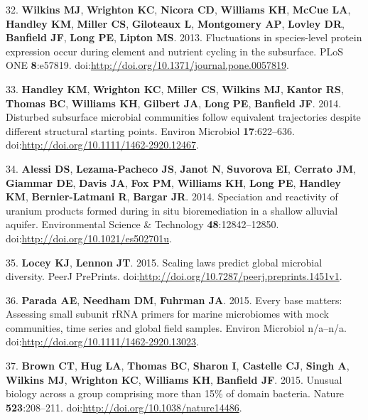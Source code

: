 \documentclass[11pt,]{article}
\begin{document}
32. \textbf{Wilkins MJ}, \textbf{Wrighton KC}, \textbf{Nicora CD},
\textbf{Williams KH}, \textbf{McCue LA}, \textbf{Handley KM},
\textbf{Miller CS}, \textbf{Giloteaux L}, \textbf{Montgomery AP},
\textbf{Lovley DR}, \textbf{Banfield JF}, \textbf{Long PE},
\textbf{Lipton MS}. 2013. Fluctuations in species-level protein
expression occur during element and nutrient cycling in the subsurface.
PLoS ONE \textbf{8}:e57819.
doi:\url{http://doi.org/10.1371/journal.pone.0057819}.

33. \textbf{Handley KM}, \textbf{Wrighton KC}, \textbf{Miller CS},
\textbf{Wilkins MJ}, \textbf{Kantor RS}, \textbf{Thomas BC},
\textbf{Williams KH}, \textbf{Gilbert JA}, \textbf{Long PE},
\textbf{Banfield JF}. 2014. Disturbed subsurface microbial communities
follow equivalent trajectories despite different structural starting
points. Environ Microbiol \textbf{17}:622--636.
doi:\url{http://doi.org/10.1111/1462-2920.12467}.

34. \textbf{Alessi DS}, \textbf{Lezama-Pacheco JS}, \textbf{Janot N},
\textbf{Suvorova EI}, \textbf{Cerrato JM}, \textbf{Giammar DE},
\textbf{Davis JA}, \textbf{Fox PM}, \textbf{Williams KH}, \textbf{Long
PE}, \textbf{Handley KM}, \textbf{Bernier-Latmani R}, \textbf{Bargar
JR}. 2014. Speciation and reactivity of uranium products formed during
in situ bioremediation in a shallow alluvial aquifer. Environmental
Science \& Technology \textbf{48}:12842--12850.
doi:\url{http://doi.org/10.1021/es502701u}.

35. \textbf{Locey KJ}, \textbf{Lennon JT}. 2015. Scaling laws predict
global microbial diversity. PeerJ PrePrints.
doi:\url{http://doi.org/10.7287/peerj.preprints.1451v1}.

36. \textbf{Parada AE}, \textbf{Needham DM}, \textbf{Fuhrman JA}. 2015.
Every base matters: Assessing small subunit rRNA primers for marine
microbiomes with mock communities, time series and global field samples.
Environ Microbiol n/a--n/a.
doi:\url{http://doi.org/10.1111/1462-2920.13023}.

37. \textbf{Brown CT}, \textbf{Hug LA}, \textbf{Thomas BC},
\textbf{Sharon I}, \textbf{Castelle CJ}, \textbf{Singh A},
\textbf{Wilkins MJ}, \textbf{Wrighton KC}, \textbf{Williams KH},
\textbf{Banfield JF}. 2015. Unusual biology across a group comprising
more than 15\% of domain bacteria. Nature \textbf{523}:208--211.
doi:\url{http://doi.org/10.1038/nature14486}.
\end{document}
